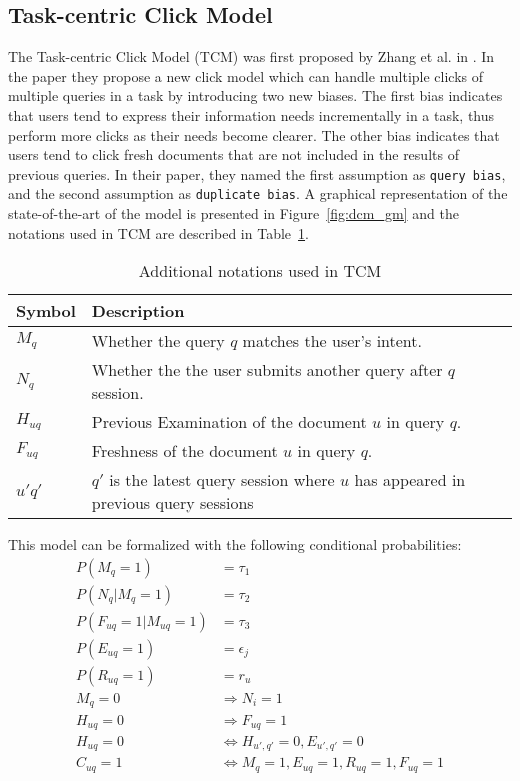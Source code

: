 \subsection{Task-centric Click Model}
\label{sec:methodology_tcm}
The Task-centric Click Model (TCM) was first proposed by Zhang et al. in \cite{Zhang2011}. In the paper they propose a new click model which can handle multiple clicks of multiple queries in a task by introducing two new biases. The first bias indicates that users tend to express their information needs incrementally in a task, thus perform more clicks as their needs become clearer. The other bias indicates that users tend to click fresh documents that are not included in the results of previous queries. In their paper, they named the first assumption as \texttt{query bias}, and the second assumption as \texttt{duplicate bias}. A graphical representation of the state-of-the-art of the model is presented in Figure~\ref{fig:dcm_gm} and the notations used in TCM are described in Table~\ref{table:tcm_notations}. 

\begin{table}[ht]
	\centering
	\begin{tabular}{l|lll|}
		\hline
		Symbol & Description \\
		\hline
		$M_q$			& Whether the query $q$ matches the user's intent.\\
		$N_q$ 			& Whether the the user submits another query after $q$ session.\\		
		$H_{uq}$ 		& Previous Examination of the document $u$ in query $q$.\\
		$F_{uq}$ 		& Freshness of the document $u$ in query $q$.\\
		$u'q'$ & $q'$ is the latest query session where \(u\) has appeared in previous query sessions \\
		\hline
	\end{tabular}
	\caption{Additional notations used in TCM}
	\label{table:tcm_notations}
\end{table}

This model can be formalized with the following conditional probabilities:
\begin{align}
	P(M_q=1) &= \tau_1 \\
	\label{eq:alpha_2}
	P(N_q|M_q=1) &= \tau_2 \\
	P(F_{uq}=1|M_{uq}=1) &= \tau_3 \\
	P(E_{uq}=1) &= \epsilon_j \\
	P(R_{uq}=1) &= r_u \\
	M_q = 0 &\Rightarrow N_i = 1\\
	H_{uq} = 0 &\Rightarrow F_{uq} = 1\\
	H_{uq} = 0 &\Leftrightarrow H_{u',q'} = 0, E_{u',q'} = 0\\
	C_{uq} = 1 &\Leftrightarrow M_q = 1, E_{uq} = 1, R_{uq} = 1, F_{uq} = 1
\end{align}

